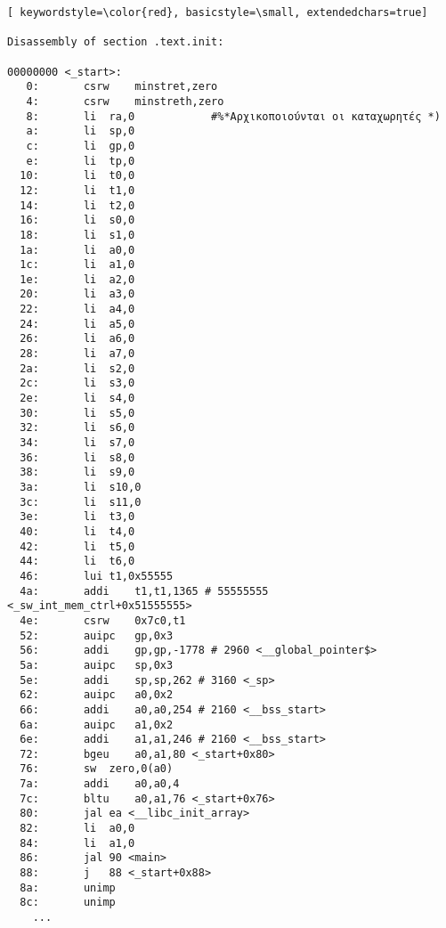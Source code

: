 \documentclass[a4paper]{article}
\begin{document}
\begin{lstlisting}[ keywordstyle=\color{red}, basicstyle=\small, extendedchars=true]

Disassembly of section .text.init:

00000000 <_start>:
   0:		csrw	minstret,zero	
   4:		csrw	minstreth,zero 	
   8:		li	ra,0			#%*Αρχικοποιούνται οι καταχωρητές *)
   a:		li	sp,0
   c:		li	gp,0
   e:		li	tp,0
  10:		li	t0,0
  12:		li	t1,0
  14:		li	t2,0
  16:		li	s0,0
  18:		li	s1,0
  1a:		li	a0,0
  1c:		li	a1,0
  1e:		li	a2,0
  20:		li	a3,0
  22:		li	a4,0
  24:		li	a5,0
  26:		li	a6,0
  28:		li	a7,0
  2a:		li	s2,0
  2c:		li	s3,0
  2e:		li	s4,0
  30:		li	s5,0
  32:		li	s6,0
  34:		li	s7,0
  36:		li	s8,0
  38:		li	s9,0
  3a:		li	s10,0
  3c:		li	s11,0
  3e:		li	t3,0
  40:		li	t4,0
  42:		li	t5,0
  44:		li	t6,0
  46:		lui	t1,0x55555
  4a:		addi	t1,t1,1365 # 55555555 <_sw_int_mem_ctrl+0x51555555>
  4e:		csrw	0x7c0,t1
  52:		auipc	gp,0x3
  56:		addi	gp,gp,-1778 # 2960 <__global_pointer$>
  5a:		auipc	sp,0x3
  5e:		addi	sp,sp,262 # 3160 <_sp>
  62:		auipc	a0,0x2
  66:		addi	a0,a0,254 # 2160 <__bss_start>
  6a:		auipc	a1,0x2
  6e:		addi	a1,a1,246 # 2160 <__bss_start>
  72:		bgeu	a0,a1,80 <_start+0x80>
  76:		sw	zero,0(a0)
  7a:		addi	a0,a0,4
  7c:		bltu	a0,a1,76 <_start+0x76>
  80:		jal	ea <__libc_init_array>
  82:		li	a0,0
  84:		li	a1,0
  86:		jal	90 <main>
  88:		j	88 <_start+0x88>
  8a:		unimp
  8c:		unimp
	...


\end{lstlisting}
\end{document}
